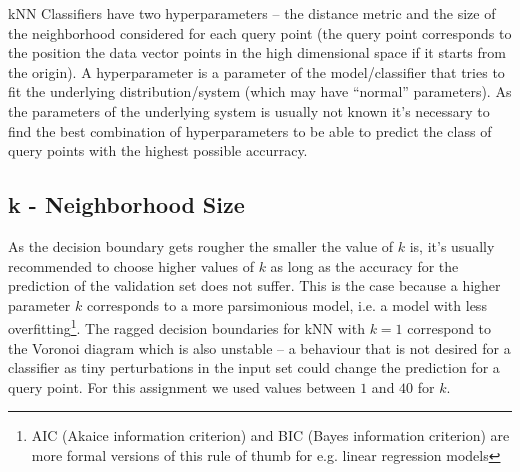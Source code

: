 kNN Classifiers have two hyperparameters -- the distance metric and the size of the neighborhood considered for each query point (the query point corresponds to the position the data vector points in the high dimensional space if it starts from the origin). A hyperparameter is a parameter of the model/classifier that tries to fit the underlying distribution/system (which may have ``normal'' parameters). As the parameters of the underlying system is usually not known it's necessary to find the best combination of hyperparameters to be able to predict the class of query points with the highest possible accurracy. 
\subsection{k - Neighborhood Size}
As the decision boundary gets rougher the smaller the value of $k$ is, it's usually recommended to choose higher values of $k$ as long as the accuracy for the prediction of the validation set does not suffer. This is the case because a higher parameter $k$ corresponds to a more parsimonious model, i.e. a model with less overfitting\footnote{AIC (Akaice information criterion) and BIC (Bayes information criterion) are more formal versions of this rule of thumb for e.g. linear regression models}. The ragged decision boundaries for kNN with $k =1$ correspond to the Voronoi diagram which is also unstable -- a behaviour that is not desired for a classifier as tiny perturbations in the input set could change the prediction for a query point. For this assignment we used values between $1$ and $40$ for $k$. 

